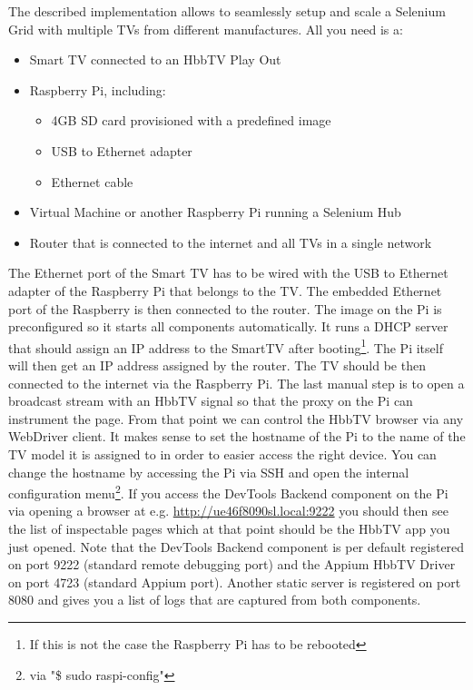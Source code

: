 The described implementation allows to seamlessly setup and scale a Selenium Grid with multiple TVs from different
manufactures. All you need is a:

\begin{itemize}
  \item Smart TV connected to an HbbTV Play Out
  \item Raspberry Pi, including:
    \begin{itemize}
      \item 4GB SD card provisioned with a predefined image
      \item USB to Ethernet adapter
      \item Ethernet cable
    \end{itemize}
  \item Virtual Machine or another Raspberry Pi running a Selenium Hub
  \item Router that is connected to the internet and all TVs in a single network
\end{itemize}

The Ethernet port of the Smart TV has to be wired with the USB to Ethernet adapter of the Raspberry Pi that belongs
to the TV. The embedded Ethernet port of the Raspberry is then connected to the router. The image on the Pi is
preconfigured so it starts all components automatically. It runs a DHCP server that should assign an IP address to the
SmartTV after booting\footnote{If this is not the case the Raspberry Pi has to be rebooted}. The Pi itself will then
get an IP address assigned by the router. The TV should be then connected to the internet via the Raspberry Pi. The
last manual step is to open a broadcast stream with an HbbTV signal so that the proxy on the Pi can instrument the page.
From that point we can control the HbbTV browser via any WebDriver client. It makes sense to set the hostname of the Pi
to the name of the TV model it is assigned to in order to easier access the right device. You can change the hostname by accessing
the Pi via SSH and open the internal configuration menu\footnote{via "\$ sudo raspi-config"}. If you access the DevTools
Backend component on the Pi via opening a browser at e.g. \url{http://ue46f8090sl.local:9222} you should then see the
list of inspectable pages which at that point should be the HbbTV app you just opened. Note that the DevTools Backend
component is per default registered on port 9222 (standard remote debugging port) and the Appium HbbTV Driver on port
4723 (standard Appium port). Another static server is registered on port 8080 and gives you a list of logs that are
captured from both components.

